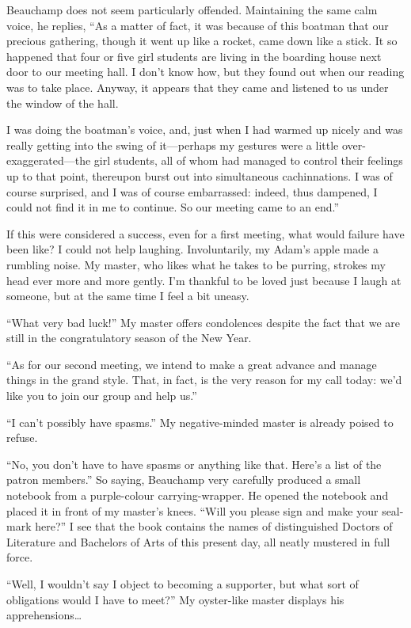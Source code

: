 \documentclass[12pt, openright]{book}
\begin{document}
Beauchamp does not seem particularly offended. Maintaining the same calm
voice, he replies, ``As a matter of fact, it was because of this boatman
that our precious gathering, though it went up like a rocket, came down
like a stick. It so happened that four or five girl students are living
in the boarding house next door to our meeting hall. I don't know how,
but they found out when our reading was to take place. Anyway, it
appears that they came and listened to us under the window of the hall.

I was doing the boatman's voice, and, just when I had warmed up nicely
and was really getting into the swing of it---perhaps my gestures were a
little over-exaggerated---the girl students, all of whom had managed to
control their feelings up to that point, thereupon burst out into
simultaneous cachinnations. I was of course surprised, and I was of
course embarrassed: indeed, thus dampened, I could not find it in me to
continue. So our meeting came to an end.''

If this were considered a success, even for a first meeting, what would
failure have been like? I could not help laughing. Involuntarily, my
Adam's apple made a rumbling noise. My master, who likes what he takes
to be purring, strokes my head ever more and more gently. I'm thankful
to be loved just because I laugh at someone, but at the same time I feel
a bit uneasy.

``What very bad luck!'' My master offers condolences despite the fact
that we are still in the congratulatory season of the New Year.

``As for our second meeting, we intend to make a great advance and
manage things in the grand style. That, in fact, is the very reason for
my call today: we'd like you to join our group and help us.''

``I can't possibly have spasms.'' My negative-minded master is already
poised to refuse.

``No, you don't have to have spasms or anything like that. Here's a list
of the patron members.'' So saying, Beauchamp very carefully produced a
small notebook from a purple-colour carrying-wrapper. He opened the
notebook and placed it in front of my master's knees. ``Will you please
sign and make your seal-mark here?'' I see that the book contains the
names of distinguished Doctors of Literature and Bachelors of Arts of
this present day, all neatly mustered in full force.

``Well, I wouldn't say I object to becoming a supporter, but what sort
of obligations would I have to meet?'' My oyster-like master displays
his apprehensions\ldots{}
\end{document}
